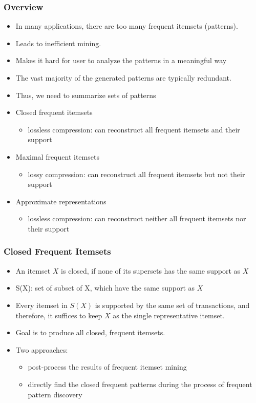\documentclass[../notes.tex]{subfiles}
\begin{document}
\subsubsection{Overview}
\begin{itemize} 
  \item In many applications, there are too many frequent itemsets (patterns).
  \item Leads to inefficient mining.
  \item Makes it hard for user to analyze the patterns in a meaningful way
  \item The vast majority of the generated patterns are typically redundant.
  \item Thus, we need to summarize sets of patterns \\

  \item Closed frequent itemsets
  \begin{itemize} 
    \item lossless compression: can reconstruct all frequent itemsets and their support
  \end{itemize}

  \item Maximal frequent itemsets
  \begin{itemize} 
    \item lossy compression: can reconstruct all frequent itemsets but not their support
  \end{itemize}

  \item Approximate representations
  \begin{itemize} 
    \item lossless compression: can reconstruct neither all frequent itemsets nor their support
  \end{itemize}
\end{itemize}

\subsubsection{Closed Frequent Itemsets}
\begin{itemize} 
  \item An itemset $X$ is closed, if none of its supersets has the same support as $X$
  \item S(X): set of subset of X, which have the same support as $X$
  \item Every itemset in $S(X)$ is supported by the same set of transactions, and therefore, it suffices to keep $X$ as the single representative itemset. 
  \item Goal is to produce all closed, frequent itemsets.
  \item Two approaches:
  \begin{itemize} 
    \item post-process the results of frequent itemset mining
    \item directly find the closed frequent patterns during the process of frequent pattern discovery
  \end{itemize}
\end{itemize}
\end{document}
